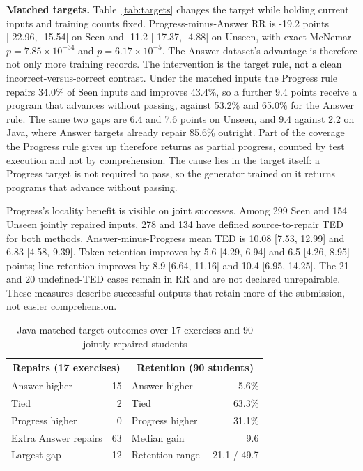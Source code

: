 \documentclass[10pt,conference]{IEEEtran}
\begin{document}
\noindent\textbf{Matched targets.} Table~\ref{tab:targets} changes the target while holding current inputs and training counts fixed. Progress-minus-Answer RR is -19.2 points [-22.96, -15.54] on Seen and -11.2 [-17.37, -4.88] on Unseen, with exact McNemar \(p=7.85\times10^{-34}\) and \(p=6.17\times10^{-5}\). The Answer dataset's advantage is therefore not only more training records. The intervention is the target rule, not a clean incorrect-versus-correct contrast. Under the matched inputs the Progress rule repairs 34.0\% of Seen inputs and improves 43.4\%, so a further 9.4 points receive a program that advances without passing, against 53.2\% and 65.0\% for the Answer rule. The same two gaps are 6.4 and 7.6 points on Unseen, and 9.4 against 2.2 on Java, where Answer targets already repair 85.6\% outright. Part of the coverage the Progress rule gives up therefore returns as partial progress, counted by test execution and not by comprehension. The cause lies in the target itself: a Progress target is not required to pass, so the generator trained on it returns programs that advance without passing.

Progress's locality benefit is visible on joint successes. Among 299 Seen and 154 Unseen jointly repaired inputs, 278 and 134 have defined source-to-repair TED for both methods. Answer-minus-Progress mean TED is 10.08 [7.53, 12.99] and 6.83 [4.58, 9.39]. Token retention improves by 5.6 [4.29, 6.94] and 6.5 [4.26, 8.95] points; line retention improves by 8.9 [6.64, 11.16] and 10.4 [6.95, 14.25]. The 21 and 20 undefined-TED cases remain in RR and are not declared unrepairable. These measures describe successful outputs that retain more of the submission, not easier comprehension.



\begin{table}[h]
\caption{Java matched-target outcomes over 17 exercises and 90 jointly repaired students}
\label{tab:uneven}
\centering\small
\begin{tabular}{@{}lr||lr@{}}
\toprule
\multicolumn{2}{c||}{Repairs (17 exercises)} & \multicolumn{2}{c}{Retention (90 students)} \\
\midrule
Answer higher & 15 & Answer higher & 5.6\% \\
Tied & 2 & Tied & 63.3\% \\
Progress higher & 0 & Progress higher & 31.1\% \\
Extra Answer repairs & 63 & Median gain & 9.6 \\
Largest gap & 12 & Retention range & -21.1 / 49.7 \\
\bottomrule
\end{tabular}
\end{table}
\end{document}
